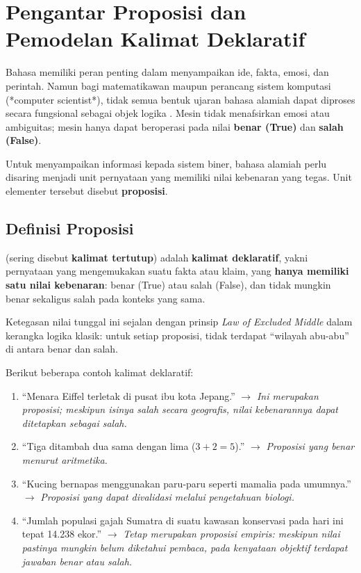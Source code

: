 \section{Pengantar Proposisi dan Pemodelan Kalimat Deklaratif}

Bahasa memiliki peran penting dalam menyampaikan ide, fakta, emosi, dan perintah. Namun bagi matematikawan maupun perancang sistem komputasi (*computer scientist*), tidak semua bentuk ujaran bahasa alamiah dapat diproses secara fungsional sebagai objek logika \cite{rosen2019}. Mesin tidak menafsirkan emosi atau ambiguitas; mesin hanya dapat beroperasi pada nilai \textbf{benar (True)} dan \textbf{salah (False)}.

Untuk menyampaikan informasi kepada sistem biner, bahasa alamiah perlu disaring menjadi unit pernyataan yang memiliki nilai kebenaran yang tegas. Unit elementer tersebut disebut \textbf{proposisi}.

\subsection{Definisi Proposisi}

\begin{definisi}
 (sering disebut \textbf{kalimat tertutup}) adalah \textbf{kalimat deklaratif}, yakni pernyataan yang mengemukakan suatu fakta atau klaim, yang \textbf{hanya memiliki satu nilai kebenaran}: benar (True) atau salah (False), dan tidak mungkin benar sekaligus salah pada konteks yang sama.
\end{definisi}

Ketegasan nilai tunggal ini sejalan dengan prinsip \textit{Law of Excluded Middle} dalam kerangka logika klasik: untuk setiap proposisi, tidak terdapat ``wilayah abu-abu'' di antara benar dan salah.

\begin{contoh}
Berikut beberapa contoh kalimat deklaratif:
\begin{enumerate}
    \item ``Menara Eiffel terletak di pusat ibu kota Jepang.'' $\rightarrow$ \textit{Ini merupakan proposisi; meskipun isinya salah secara geografis, nilai kebenarannya dapat ditetapkan sebagai salah.}
    \item ``Tiga ditambah dua sama dengan lima ($3 + 2 = 5$).'' $\rightarrow$ \textit{Proposisi yang benar menurut aritmetika.}
    \item ``Kucing bernapas menggunakan paru-paru seperti mamalia pada umumnya.'' $\rightarrow$ \textit{Proposisi yang dapat divalidasi melalui pengetahuan biologi.}
    \item ``Jumlah populasi gajah Sumatra di suatu kawasan konservasi pada hari ini tepat 14.238 ekor.'' $\rightarrow$ \textit{Tetap merupakan proposisi empiris: meskipun nilai pastinya mungkin belum diketahui pembaca, pada kenyataan objektif terdapat jawaban benar atau salah.}
\end{enumerate}
\end{contoh}

